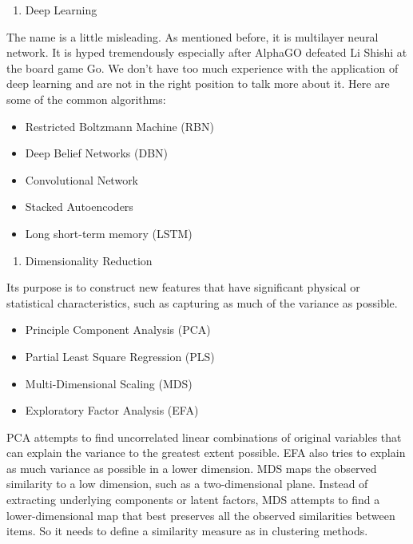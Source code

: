 \documentclass[12pt,]{krantz}
\providecommand{\tightlist}{%
  \setlength{\itemsep}{0pt}\setlength{\parskip}{0pt}}
\theoremstyle{definition}
\theoremstyle{definition}
\theoremstyle{remark}
\begin{document}
\begin{enumerate}
\def\labelenumi{\arabic{enumi}.}
\setcounter{enumi}{10}
\tightlist
\item
  Deep Learning
\end{enumerate}

The name is a little misleading. As mentioned before, it is multilayer
neural network. It is hyped tremendously especially after AlphaGO
defeated Li Shishi at the board game Go. We don't have too much
experience with the application of deep learning and are not in the
right position to talk more about it. Here are some of the common
algorithms:

\begin{itemize}
\tightlist
\item
  Restricted Boltzmann Machine (RBN)
\item
  Deep Belief Networks (DBN)
\item
  Convolutional Network
\item
  Stacked Autoencoders
\item
  Long short-term memory (LSTM)
\end{itemize}

\begin{enumerate}
\def\labelenumi{\arabic{enumi}.}
\setcounter{enumi}{11}
\tightlist
\item
  Dimensionality Reduction
\end{enumerate}

Its purpose is to construct new features that have significant physical
or statistical characteristics, such as capturing as much of the
variance as possible.

\begin{itemize}
\tightlist
\item
  Principle Component Analysis (PCA)
\item
  Partial Least Square Regression (PLS)
\item
  Multi-Dimensional Scaling (MDS)
\item
  Exploratory Factor Analysis (EFA)
\end{itemize}

PCA attempts to find uncorrelated linear combinations of original
variables that can explain the variance to the greatest extent possible.
EFA also tries to explain as much variance as possible in a lower
dimension. MDS maps the observed similarity to a low dimension, such as
a two-dimensional plane. Instead of extracting underlying components or
latent factors, MDS attempts to find a lower-dimensional map that best
preserves all the observed similarities between items. So it needs to
define a similarity measure as in clustering methods.
\end{document}

